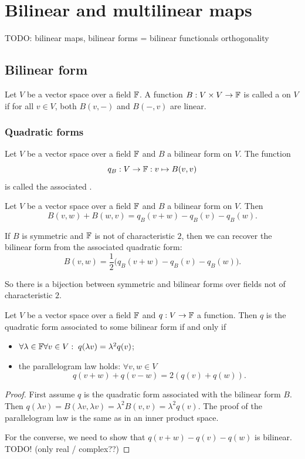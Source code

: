 \chapter{Bilinear and multilinear maps}
TODO: bilinear maps, bilinear forms = bilinear functionals
orthogonality

\section{Bilinear form}
\begin{definition}
Let $V$ be a vector space over a field $\mathbb{F}$. A function $B:V\times V\to \mathbb{F}$ is called a  on $V$ if for all $v\in V$, both $B(v,-)$ and $B(-,v)$ are linear.
\end{definition}

\subsection{Quadratic forms}
\begin{definition}
Let $V$ be a vector space over a field $\mathbb{F}$ and $B$ a bilinear form on $V$. The function
\[ q_B: V\to \mathbb{F}: v\mapsto B(v,v) \]
is called the associated .
\end{definition}

\begin{proposition} \label{quadraticToBilinearForm}
Let $V$ be a vector space over a field $\mathbb{F}$ and $B$ a bilinear form on $V$. Then
\[ B(v,w) + B(w,v) = q_B(v+w) - q_B(v) - q_B(w). \]
\end{proposition}
\begin{corollary}
If $B$ is symmetric and $\mathbb{F}$ is not of characteristic $2$, then we can recover the bilinear form from the associated quadratic form:
\[ B(v,w) = \frac{1}{2}\Big(q_B(v+w) - q_B(v) - q_B(w)\Big). \]
\end{corollary}
So there is a bijection between symmetric and bilinear forms over fields not of characteristic $2$.

\begin{proposition}
Let $V$ be a vector space over a field $\mathbb{F}$ and $q: V\to \mathbb{F}$ a function. Then $q$ is the quadratic form associated to some bilinear form \textup{if and only if}
\begin{itemize}
    \item $\forall \lambda \in \mathbb{F}\forall v\in V: \; q(\lambda v) = \lambda^2 q(v)$;
    \item the parallelogram law holds: $\forall v,w\in V$
    \[ q(v+w) + q(v-w) = 2(q(v)+q(w)). \]
\end{itemize}
\end{proposition}
\begin{proof}
First assume $q$ is the quadratic form associated with the bilinear form $B$. Then $q(\lambda v) = B(\lambda v, \lambda v) = \lambda^2 B(v,v) = \lambda^2 q(v)$. The proof of the parallelogram law is the same as in an inner product space.

For the converse, we need to show that $q(v+w) - q(v) - q(w)$ is bilinear. TODO! (only real / complex??)
\end{proof}

